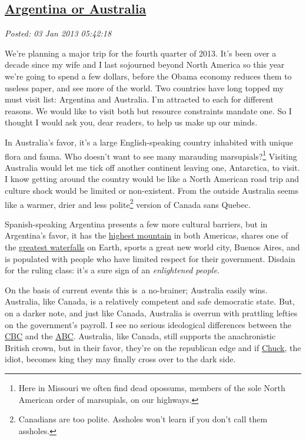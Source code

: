 %

\subsection*{\href{https://bakerjd99.wordpress.com/2013/01/02/argentina-or-australia/}{Argentina or Australia}}


\noindent\emph{Posted: 03 Jan 2013 05:42:18}
\vspace{6pt}

We're planning a major trip for the fourth quarter of 2013. It's been
over a decade since my wife and I last sojourned beyond North America so
this year we're going to spend a few dollars, before the Obama economy
reduces them to useless paper, and see more of the world. Two countries
have long topped my must visit list: Argentina and Australia. I'm
attracted to each for different reasons. We would like to visit both but
resource constraints mandate one. So I thought I would ask you, dear
readers, to help us make up our minds.

In Australia's favor, it's a large English-speaking country inhabited
with unique flora and fauna. Who doesn't want to see many marauding
marsupials?\footnote{ Here in Missouri we often find dead opossums, members of the sole
  North American order of marsupials, on our
  highways.
} Visiting Australia would
let me tick off another continent leaving one, Antarctica, to visit. I
know getting around the country would be like a North American road trip
and culture shock would be limited or non-existent. From the outside
Australia seems like a warmer, drier and less
polite\footnote{Canadians are too polite. Assholes won't learn if you don't call them
  assholes.
} version of Canada sans Quebec.

Spanish-speaking Argentina presents a few more cultural barriers, but in
Argentina's favor, it has the
\href{http://www.aconcagua.com/about-aconcagua/location/}{highest
mountain} in both Americas, shares one of the
\href{http://www.worldwaterfalldatabase.com/waterfall/Iguazu-Cataratas-del-109/}{greatest
waterfalls} on Earth, sports a great new world city, Buenos Aires, and
is populated with people who have limited respect for their government.
Disdain for the ruling class: it's a sure sign of an \emph{enlightened
people.}

On the basis of current events this is~a no-brainer; Australia easily
wins. Australia, like Canada, is a relatively competent and safe
democratic state. But, on a darker note, and just like Canada, Australia
is overrun with prattling lefties on the government's payroll. I see no
serious ideological differences between the
\href{http://www.cbc.ca/}{CBC} and the
\href{http://www.abc.net.au/}{ABC}. Australia, like Canada, still
supports the anachronistic British crown, but in their favor, they're on
the republican edge and if
\href{http://www.spectator.co.uk/columnists/james-delingpole/6157403/is-prince-charles-illadvised-or-merely-idiotic/}{Chuck},
the idiot, becomes king they may finally cross over to the dark side.

